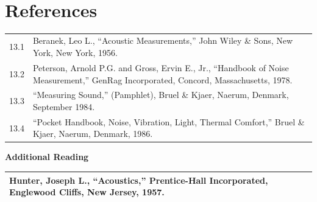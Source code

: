 \documentclass[
]{book}
\begin{document}
~

\hypertarget{references-11}{%
\section{References}\label{references-11}}

\begin{longtable}[]{@{}ll@{}}
\toprule
\endhead
\begin{minipage}[t]{0.06\columnwidth}\raggedright
13.1\strut
\end{minipage} & \begin{minipage}[t]{0.88\columnwidth}\raggedright
Beranek, Leo L., ``Acoustic Measurements,'' John Wiley \& Sons, New York, New York, 1956.\strut
\end{minipage}\tabularnewline
\begin{minipage}[t]{0.06\columnwidth}\raggedright
13.2\strut
\end{minipage} & \begin{minipage}[t]{0.88\columnwidth}\raggedright
Peterson, Arnold P.G. and Gross, Ervin E., Jr., ``Handbook of Noise Measurement,'' GenRag Incorporated, Concord, Massachusetts, 1978.\strut
\end{minipage}\tabularnewline
\begin{minipage}[t]{0.06\columnwidth}\raggedright
13.3\strut
\end{minipage} & \begin{minipage}[t]{0.88\columnwidth}\raggedright
``Measuring Sound,'' (Pamphlet), Bruel \& Kjaer, Naerum, Denmark, September 1984.\strut
\end{minipage}\tabularnewline
\begin{minipage}[t]{0.06\columnwidth}\raggedright
13.4\strut
\end{minipage} & \begin{minipage}[t]{0.88\columnwidth}\raggedright
``Pocket Handbook, Noise, Vibration, Light, Thermal Comfort,'' Bruel \& Kjaer, Naerum, Denmark, 1986.\strut
\end{minipage}\tabularnewline
\bottomrule
\end{longtable}

\textbf{Additional Reading}

\begin{longtable}[]{@{}l@{}}
\toprule
\endhead
\begin{minipage}[t]{0.97\columnwidth}\raggedright
Hunter, Joseph L., ``Acoustics,'' Prentice-Hall Incorporated, Englewood Cliffs, New Jersey, 1957.\strut
\end{minipage}\tabularnewline
\bottomrule
\end{longtable}
\end{document}
